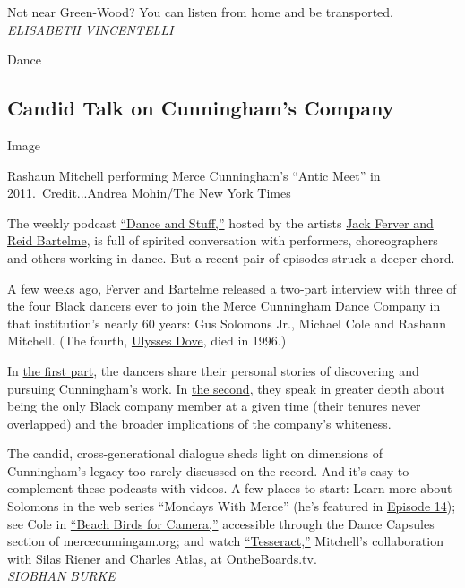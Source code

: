 Not near Green-Wood? You can listen from home and be transported.\\
\emph{ELISABETH VINCENTELLI}

Dance

\hypertarget{candid-talk-on-cunninghams-company}{%
\subsection{Candid Talk on Cunningham's
Company}\label{candid-talk-on-cunninghams-company}}

Image

Rashaun Mitchell performing Merce Cunningham's ``Antic Meet'' in
2011.~Credit...Andrea Mohin/The New York Times

The weekly podcast \href{https://www.danceandstuff.com/}{``Dance and
Stuff,''} hosted by the artists
\href{https://www.nytimes3xbfgragh.onion/2020/05/05/arts/dance/reid-bartelme-jack-ferver-podcast.html}{Jack
Ferver and Reid Bartelme}, is full of spirited conversation with
performers, choreographers and others working in dance. But a recent
pair of episodes struck a deeper chord.

A few weeks ago, Ferver and Bartelme released a two-part interview with
three of the four Black dancers ever to join the Merce Cunningham Dance
Company in that institution's nearly 60 years: Gus Solomons Jr., Michael
Cole and Rashaun Mitchell. (The fourth,
\href{https://charlierose.com/videos/15779}{Ulysses Dove}, died in
1996.)

In
\href{https://anchor.fm/danceandstuff/episodes/Episode-159-With-Gus-Solomons--Jr---Michael-Cole--and-Rashaun-Mitchell-eg322s}{the
first part}, the dancers share their personal stories of discovering and
pursuing Cunningham's work. In
\href{https://anchor.fm/danceandstuff/episodes/Episode-160-Dancing-for-Merce-Cunningham-eg7ed4}{the
second}, they speak in greater depth about being the only Black company
member at a given time (their tenures never overlapped) and the broader
implications of the company's whiteness.

The candid, cross-generational dialogue sheds light on dimensions of
Cunningham's legacy too rarely discussed on the record. And it's easy to
complement these podcasts with videos. A few places to start: Learn more
about Solomons in the web series ``Mondays With Merce'' (he's featured
in \href{https://www.youtube.com/watch?v=_rRKRX0U6NA}{Episode 14}); see
Cole in
\href{https://dancecapsules.mercecunningham.org/overview.cfm?capid=46030}{``Beach
Birds for Camera,''} accessible through the Dance Capsules section of
mercecunningam.org; and watch
\href{https://www.ontheboards.tv/performances/tesseract-o}{``Tesseract,''}
Mitchell's collaboration with Silas Riener and Charles Atlas, at
OntheBoards.tv.\\
\emph{SIOBHAN BURKE}

